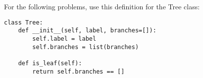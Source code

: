 For the following problems, use this definition for the Tree class:
\begin{lstlisting}
class Tree:
    def __init__(self, label, branches=[]):
        self.label = label
        self.branches = list(branches)

    def is_leaf(self):
        return self.branches == []
\end{lstlisting}


